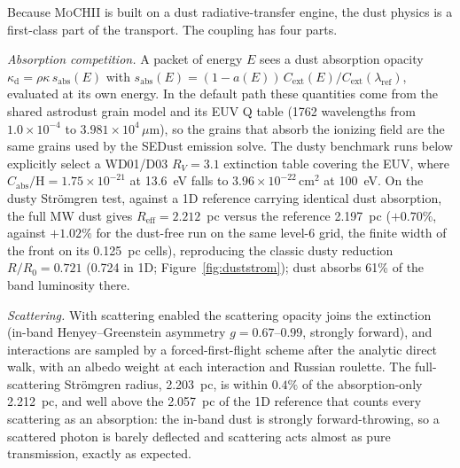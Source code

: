 \documentclass[twocolumn,linenumbers]{aastex702}
\newcommand{\MoCHII}{\textsc{MoCHII}}
\begin{document}
Because \MoCHII{} is built on a dust radiative-transfer engine, the dust
physics is a first-class part of the transport.  The coupling has four
parts.

\emph{Absorption competition.}  A packet of energy $E$ sees a dust
absorption opacity $\kappa_{\mathrm{d}} = \rho\kappa\,s_{\mathrm{abs}}(E)$
with $s_{\mathrm{abs}}(E) = (1-a(E))\,C_{\mathrm{ext}}(E)/
C_{\mathrm{ext}}(\lambda_{\mathrm{ref}})$, evaluated at its own energy.  In the default path these
quantities come from the shared astrodust grain model and its EUV Q table
(1762 wavelengths from $1.0\times10^{-4}$ to
$3.981\times10^{4}\,\mu$m), so the grains that absorb the ionizing field
are the same grains used by the SEDust emission solve.  The dusty benchmark
runs below explicitly select a WD01/D03 $R_V = 3.1$ extinction table
\citep{weingartner2001,draine2003} covering the EUV, where
$C_{\mathrm{abs}}/\mathrm{H} = 1.75\times10^{-21}$ at 13.6~eV falls to
$3.96\times10^{-22}\,\mathrm{cm^2}$ at 100~eV.  On the dusty Str\"omgren
test, against a 1D reference carrying identical dust absorption, the full
MW dust gives $R_{\mathrm{eff}} = 2.212$~pc versus the reference 2.197~pc
($+0.70\%$, against $+1.02\%$ for the dust-free run on the same level-6
grid, the finite width of the front on its 0.125~pc cells), reproducing the
classic dusty reduction $R/R_0 = 0.721$ (0.724 in 1D;
Figure~\ref{fig:duststrom}); dust absorbs 61\% of the band luminosity
there.

\emph{Scattering.}  With scattering enabled the scattering opacity joins
the extinction (in-band Henyey--Greenstein asymmetry $g = 0.67$--$0.99$,
strongly forward), and interactions are sampled by a forced-first-flight
scheme after the analytic direct walk, with an albedo weight at each
interaction and Russian roulette.  The full-scattering Str\"omgren radius,
2.203~pc, is within $0.4\%$ of the absorption-only 2.212~pc, and well above
the 2.057~pc of the 1D reference that counts every scattering as an
absorption: the in-band
dust is strongly forward-throwing, so a scattered photon is barely deflected
and scattering acts almost as pure transmission, exactly as expected.
\end{document}
